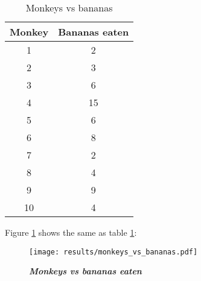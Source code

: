 \begin{table}[h!]
    \begin{center}
        \begin{tabular}{|c|c|}
        \hline
        \textbf{Monkey}  &  \textbf{Bananas eaten} \\ \hline
        1   &   2  \\ \hline
        2   &   3  \\ \hline
        3   &   6  \\ \hline
        4   &   15  \\ \hline
        5   &   6  \\ \hline
        6   &   8  \\ \hline
        7   &   2  \\ \hline
        8   &   4  \\ \hline
        9   &   9  \\ \hline
        10  &   4  \\ \hline
        \end{tabular}
    \end{center}
  \caption{Monkeys vs bananas}
  \label{table_monkeys_vs_bananas}
\end{table}

Figure \ref{fig_monkeys_vs_bananas} shows the same as table \ref{table_monkeys_vs_bananas}:

\begin{figure}[h!]
        \begin{center}
        \texttt{[image: results/monkeys\_vs\_bananas.pdf]}
        \end{center}
    \caption[Monkeys vs bananas eaten]{
    \textit{\textbf{Monkeys vs bananas eaten} 
      }
    }
    \label{fig_monkeys_vs_bananas}    
\end{figure}

